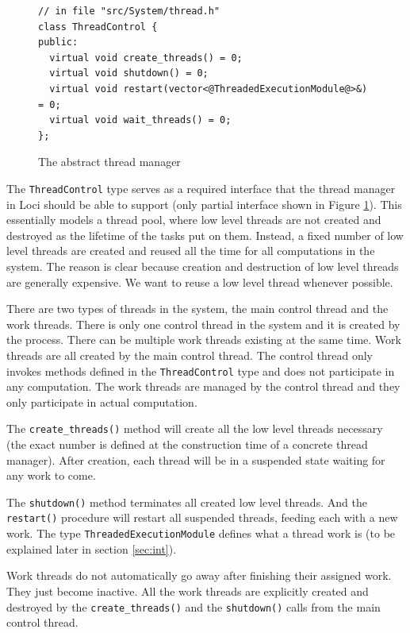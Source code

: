 \documentclass{article}
\begin{document}
\begin{figure}[h]
\begin{lstlisting}
// in file "src/System/thread.h"
class ThreadControl {
public:
  virtual void create_threads() = 0;
  virtual void shutdown() = 0;
  virtual void restart(vector<@ThreadedExecutionModule@>&) = 0;
  virtual void wait_threads() = 0;
};
\end{lstlisting}
\caption{The abstract thread manager\label{fig:tm}}
\end{figure}

The \lstinline{ThreadControl} type serves as a required interface that
the thread manager in Loci should be able to support (only partial
interface shown in Figure \ref{fig:tm}).  This essentially models a
thread pool, where low level threads are not created and destroyed as
the lifetime of the tasks put on them.  Instead, a fixed number of
low level threads are created and reused all the time for all
computations in the system.  The reason is clear because creation and
destruction of low level threads are generally expensive.  We want to
reuse a low level thread whenever possible.

There are two types of threads in the system, the main control thread
and the work threads.  There is only one control thread in the system
and it is created by the process.  There can be multiple work
threads existing at the same time.  Work threads are all created by the
main control thread.  The control thread only invokes
methods defined in the \lstinline{ThreadControl} type and does not
participate in any computation.  The work threads are managed by the
control thread and they only participate in actual computation.

The \lstinline{create_threads()} method will create all the low level
threads necessary (the exact number is defined at the construction time
of a concrete thread manager).  After creation, each thread will be in a
suspended state waiting for any work to come.

The \lstinline{shutdown()} method terminates all created low level
threads. And the \lstinline{restart()} procedure will restart all
suspended threads, feeding each with a new work.  The type
\lstinline{ThreadedExecutionModule} defines what a thread work is
(to be explained later in section \ref{sec:int}).

Work threads do not automatically go away after finishing their
assigned work.  They just become inactive.  All the work threads are
explicitly created and destroyed by the \lstinline{create_threads()} and
the \lstinline{shutdown()} calls from the main control thread.
\end{document}
